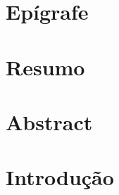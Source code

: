 \documentclass[12pt, a4paper, twoside]{article}
\numberwithin{equation}{subsection}
\def\blankpage{%
      \clearpage%
      \thispagestyle{empty}%
      \addtocounter{page}{-1}%
      \null%
      \clearpage}
\begin{document}
% 

\section*{Epígrafe}

\newpage

% 

\section*{Resumo}

\newpage

% 

\section*{Abstract}

\newpage


\graphicspath{ {arquivos/graficos/} }
\graphicspath{{arquivo/imgs/}}

\listoftables
\newpage

\listoffigures
\newpage



\tableofcontents

\blankpage
\newpage

\section{Introdução}

\newpage
\end{document}
